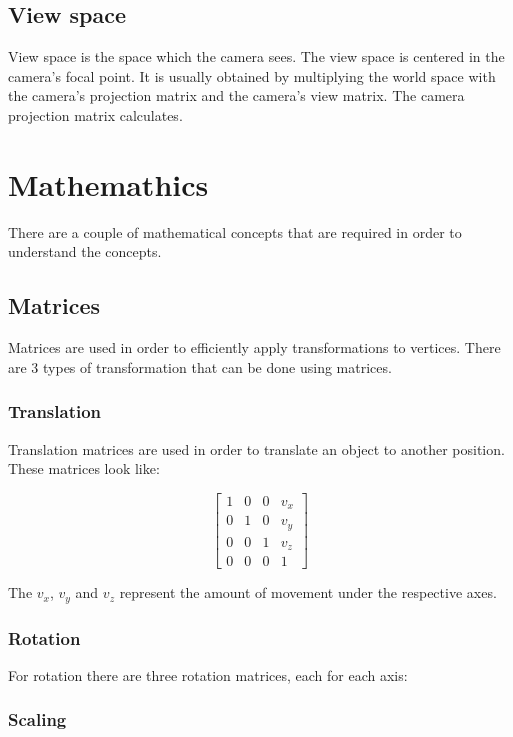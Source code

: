 \subsection{View space}

View space is the space which the camera sees. The view space is centered in the camera’s focal point. It is usually obtained by multiplying the world space with the camera’s projection matrix and the camera’s view matrix. The camera projection matrix calculates.

\section{Mathemathics}

There are a couple of mathematical concepts that are required in order to understand the concepts.

\subsection{Matrices}

Matrices are used in order to efficiently apply transformations to vertices. There are 3 types of transformation that can be done using matrices.

\subsubsection{Translation}

Translation matrices are used in order to translate an object to another position. These matrices look like:

\[ \begin{bmatrix}
	1 & 0 & 0 & v_{x}\\ 
	0 & 1 & 0 & v_{y}\\ 
	0 & 0 & 1 & v_{z}\\ 
	0 & 0 & 0 & 1
\end{bmatrix}
\]

The \(v_{x}\), \(v_{y}\) and \(v_{z}\) represent the amount of movement under the respective axes.

\subsubsection{Rotation}

For rotation there are three rotation matrices, each for each axis:


\subsubsection{Scaling}

